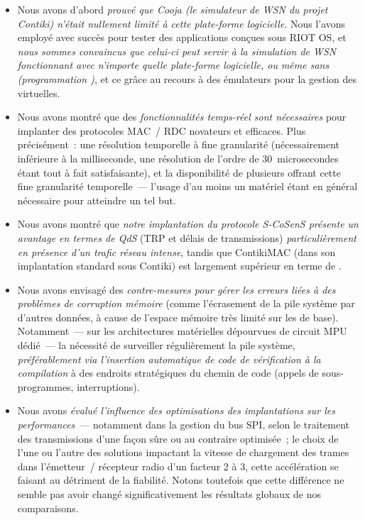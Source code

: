 \begin{itemize}

\item Nous avons d'abord \emph{prouvé que Cooja (le simulateur de WSN du
projet Contiki) n'était nullement limité à cette plate-forme logicielle}.
Nous l'avons employé avec succès pour tester des applications conçues sous
RIOT OS, et \emph{nous sommes convaincus que celui-ci peut servir à la
simulation de WSN fonctionnant avec n'importe quelle plate-forme logicielle,
ou même sans (programmation )}, et ce grâce au recours
à des émulateurs pour la gestion des  virtuelles.

\item Nous avons montré que des \emph{fonctionnalités temps-réel sont
nécessaires} pour implanter des protocoles MAC~/ RDC novateurs et
efficaces. Plus précisément~: une résolution temporelle à fine
granularité (nécessairement inférieure à la milliseconde, une résolution
de l'ordre de 30~microsecondes étant tout à fait satisfaisante), et la
disponibilité de plusieurs  offrant cette fine granularité
temporelle~--- l'usage d'au moins un  matériel étant en général
nécessaire pour atteindre un tel but.

\item Nous avons montré que \emph{notre implantation du protocole
S-CoSenS présente un avantage en termes de QdS} (TRP et délais de
transmissions) \emph{particulièrement en présence d'un trafic réseau
intense}, tandis que ContikiMAC (dans son implantation standard
sous Contiki) est largement supérieur en terme de .

\item Nous avons envisagé des \emph{contre-mesures pour gérer les erreurs
liées à des problèmes de corruption mémoire} (comme l'écrasement de
la pile système par d'autres données, à cause de l'espace mémoire
très limité sur les  de base).
Notamment~--- sur les architectures matérielles dépourvues de circuit
MPU dédié~--- la nécessité de surveiller régulièrement la pile système,
\emph{préférablement via l'insertion automatique de code de vérification
à la compilation} à des endroits stratégiques du chemin de code (appels
de sous-programmes, interruptions).

\item Nous avons \emph{évalué l'influence des optimisations des
implantations sur les performances}~--- notamment dans la gestion du bus
SPI, selon le traitement des transmissions d'une façon sûre ou au contraire
optimisée~; le choix de l'une ou l'autre des solutions impactant la vitesse
de chargement des trames dans l'émetteur~/ récepteur radio d'un facteur
2 à 3, cette accélération se faisant au détriment de la fiabilité.
Notons toutefois que cette différence ne semble pas avoir changé
significativement les résultats globaux de nos comparaisons.


\end{itemize}
